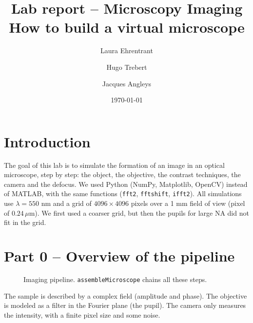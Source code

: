 \documentclass[11pt]{article}
\author{Laura Ehrentrant \and Hugo Trebert \and Jacques Angleys}
\title{Lab report -- Microscopy Imaging\\How to build a virtual microscope}
\date{\today}
\begin{document}
\maketitle

\section*{Introduction}

The goal of this lab is to simulate the formation of an image in an optical microscope, step by step: the object, the objective, the contrast techniques, the camera and the defocus. We used Python (NumPy, Matplotlib, OpenCV) instead of MATLAB, with the same functions (\texttt{fft2}, \texttt{fftshift}, \texttt{ifft2}). All simulations use $\lambda = 550$ nm and a grid of $4096 \times 4096$ pixels over a 1 mm field of view (pixel of $0.24\,\mu$m). We first used a coarser grid, but then the pupils for large NA did not fit in the grid.

\section{Part 0 -- Overview of the pipeline}

\begin{figure}[H]
\centering
{}
\caption{Imaging pipeline. \texttt{assembleMicroscope} chains all these steps.}
\label{fig:pipeline}
\end{figure}

The sample is described by a complex field (amplitude and phase). The objective is modeled as a filter in the Fourier plane (the pupil). The camera only measures the intensity, with a finite pixel size and some noise.
\end{document}
